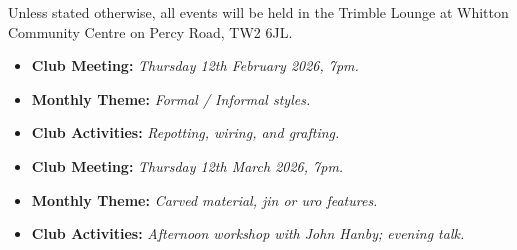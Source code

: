 \label{2026-01-themes}
\noindent
Unless stated otherwise, all events will be held in the Trimble Lounge at Whitton Community Centre on Percy Road, TW2 6JL.



\begin{itemize}
    \item \textbf{Club Meeting:} \textit{Thursday 12th February 2026, 7pm.}
    \item \textbf{Monthly Theme:} \textit{Formal / Informal styles.}
    \item \textbf{Club Activities:} \textit{Repotting, wiring, and grafting.}
\end{itemize}

\begin{itemize}
    \item \textbf{Club Meeting:} \textit{Thursday 12th March 2026, 7pm.}
    \item \textbf{Monthly Theme:} \textit{Carved material, jin or uro features.}
    \item \textbf{Club Activities:} \textit{Afternoon workshop with John Hanby; evening talk.}
\end{itemize}

